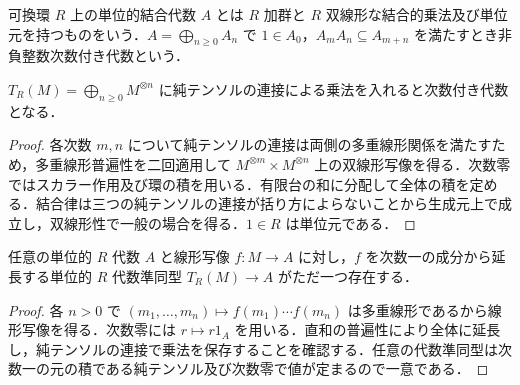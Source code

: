 \begin{defn}[次数付き代数]
可換環 $R$ 上の単位的結合代数 $A$ とは $R$ 加群と $R$ 双線形な結合的乗法及び単位元を持つものをいう．$A=\bigoplus_{n\geq0}A_n$ で $1\in A_0$，$A_mA_n\subseteq A_{m+n}$ を満たすとき非負整数次数付き代数という．
\end{defn}
\begin{prop}[テンソル代数]
$T_R(M)=\bigoplus_{n\geq0}M^{\otimes n}$ に純テンソルの連接による乗法を入れると次数付き代数となる．
\end{prop}
\begin{proof}
各次数 $m,n$ について純テンソルの連接は両側の多重線形関係を満たすため，多重線形普遍性を二回適用して $M^{\otimes m}\times M^{\otimes n}$ 上の双線形写像を得る．次数零ではスカラー作用及び環の積を用いる．有限台の和に分配して全体の積を定める．結合律は三つの純テンソルの連接が括り方によらないことから生成元上で成立し，双線形性で一般の場合を得る．$1\in R$ は単位元である．
\end{proof}
\begin{prop}[テンソル代数の普遍性]
任意の単位的 $R$ 代数 $A$ と線形写像 $f:M\to A$ に対し，$f$ を次数一の成分から延長する単位的 $R$ 代数準同型 $T_R(M)\to A$ がただ一つ存在する．
\end{prop}
\begin{proof}
各 $n>0$ で $(m_1,\ldots,m_n)\mapsto f(m_1)\cdots f(m_n)$ は多重線形であるから線形写像を得る．次数零には $r\mapsto r1_A$ を用いる．直和の普遍性により全体に延長し，純テンソルの連接で乗法を保存することを確認する．任意の代数準同型は次数一の元の積である純テンソル及び次数零で値が定まるので一意である．
\end{proof}
